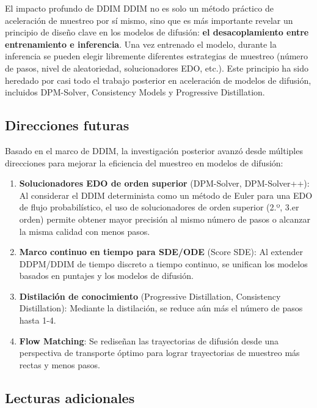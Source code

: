 \begin{importantbox}{El impacto profundo de DDIM}
DDIM no es solo un método práctico de aceleración de muestreo por sí mismo, sino que es más importante revelar un principio de diseño clave en los modelos de difusión: \textbf{el desacoplamiento entre entrenamiento e inferencia}. Una vez entrenado el modelo, durante la inferencia se pueden elegir libremente diferentes estrategias de muestreo (número de pasos, nivel de aleatoriedad, solucionadores EDO, etc.). Este principio ha sido heredado por casi todo el trabajo posterior en aceleración de modelos de difusión, incluidos DPM-Solver, Consistency Models y Progressive Distillation.
\end{importantbox}

\subsection{Direcciones futuras}

Basado en el marco de DDIM, la investigación posterior avanzó desde múltiples direcciones para mejorar la eficiencia del muestreo en modelos de difusión:

\begin{enumerate}
    \item \textbf{Solucionadores EDO de orden superior} (DPM-Solver, DPM-Solver++): Al considerar el DDIM determinista como un método de Euler para una EDO de flujo probabilístico, el uso de solucionadores de orden superior (2.º, 3.er orden) permite obtener mayor precisión al mismo número de pasos o alcanzar la misma calidad con menos pasos.
    \item \textbf{Marco continuo en tiempo para SDE/ODE} (Score SDE): Al extender DDPM/DDIM de tiempo discreto a tiempo continuo, se unifican los modelos basados en puntajes y los modelos de difusión.
    \item \textbf{Distilación de conocimiento} (Progressive Distillation, Consistency Distillation): Mediante la distilación, se reduce aún más el número de pasos hasta 1-4.
    \item \textbf{Flow Matching}: Se rediseñan las trayectorias de difusión desde una perspectiva de transporte óptimo para lograr trayectorias de muestreo más rectas y menos pasos.
\end{enumerate}

\subsection{Lecturas adicionales}

